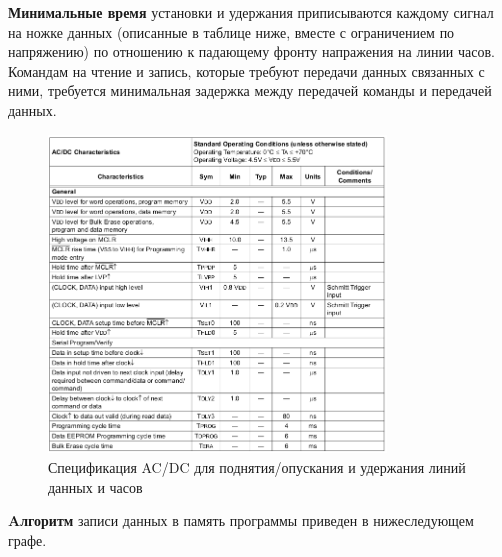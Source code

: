 \newpage

\textbf{Минимальные время} установки и удержания приписываются каждому сигнал на ножке данных 
(описанные в таблице ниже, вместе с ограничением по напряжению) по
отношению к падающему фронту напражения на линии часов. Командам на чтение и запись, которые
требуют передачи данных связанных с ними,
требуется минимальная задержка между передачей команды и передачей данных.

\begin{figure}[h!]
    \centering
    \includegraphics[width=0.8\textwidth]{2017-05-08_at_03:39:19_screenshot.png}
    \caption{Спецификация AC/DC для поднятия/опускания и удержания линий данных и часов}
\end{figure}

\newpage

\textbf{Aлгоритм} записи данных в память программы приведен в нижеследующем графе.

